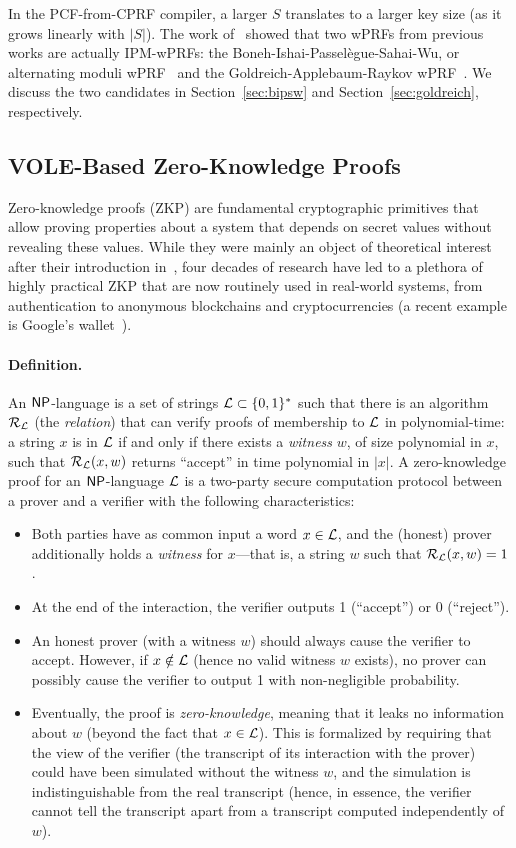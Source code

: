 In the PCF-from-CPRF compiler, a larger $S$ translates to a larger key size (as it grows linearly with $|S|$). The work of~\cite{EC:BCMPR24} showed that two wPRFs from previous works are actually IPM-wPRFs: the Boneh-Ishai-Passelègue-Sahai-Wu, or alternating moduli wPRF~\cite{TCC:BIPSW18} and the Goldreich-Applebaum-Raykov wPRF~\cite{DBLP:journals/eccc/ECCC-TR00-090,TCC:AppRay16b}. We discuss the two candidates in Section~\ref{sec:bipsw} and Section~\ref{sec:goldreich}, respectively.

\subsection{VOLE-Based Zero-Knowledge Proofs}

Zero-knowledge proofs (ZKP) are fundamental cryptographic primitives that allow proving properties about a system that depends on secret values without revealing these values. While they were mainly an object of theoretical interest after their introduction in~\cite{GolMicRac89}, four decades of research have led to a plethora of highly practical ZKP that are now routinely used in real-world systems, from authentication to anonymous blockchains and cryptocurrencies (a recent example is Google's wallet~\cite{googlewallet}).

\paragraph{Definition.} An $\mathsf{NP}$-language is a set of strings $\mathcal{L}\subset \{0,1\}^*$ such that there is an algorithm $\mathcal{R}_\mathcal{L}$ (the \emph{relation}) that can verify proofs of membership to $\mathcal{L}$ in polynomial-time: a string $x$ is in $\mathcal{L}$ if and only if there exists a \emph{witness} $w$, of size polynomial in $x$, such that $\mathcal{R}_\mathcal{L}(x,w)$ returns ``accept'' in time polynomial in $|x|$. A zero-knowledge proof for an $\mathsf{NP}$-language $\mathcal{L}$ is a two-party secure computation protocol between a prover and a verifier with the following characteristics:
\begin{itemize}
	\item Both parties have as common input a word $x \in \mathcal{L}$, and the (honest) prover additionally holds a \emph{witness} for $x$---that is, a string $w$ such that $\mathcal{R}_\mathcal{L}(x,w)=1$.
	\item At the end of the interaction, the verifier outputs 1 (``accept'') or 0 (``reject'').
	\item An honest prover (with a witness $w$) should always cause the verifier to accept. However, if $x\notin\mathcal{L}$ (hence no valid witness $w$ exists), no prover can possibly cause the verifier to output 1 with non-negligible probability.
	\item Eventually, the proof is \emph{zero-knowledge}, meaning that it leaks no information about $w$ (beyond the fact that $x\in \mathcal{L}$). This is formalized by requiring that the view of the verifier (the transcript of its interaction with the prover) could have been simulated without the witness $w$, and the simulation is indistinguishable from the real transcript (hence, in essence, the verifier cannot tell the transcript apart from a transcript computed independently of $w$).
\end{itemize}

